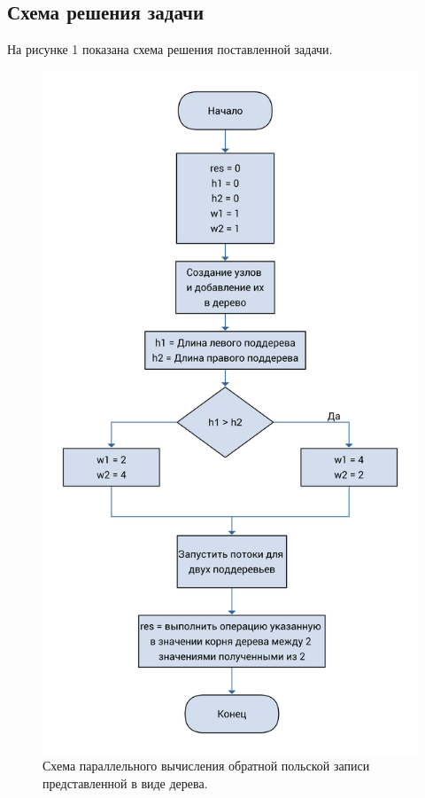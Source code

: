 \documentclass[a4paper, 12pt]{article}
\begin{document}
	\subsection{Схема решения задачи}
	\hspace*{5mm} На рисунке 1 показана схема решения поставленной задачи. 
	\begin{figure}[h!]
		\centering \includegraphics[scale=0.060]{1}
		\centering\caption{Схема параллельного вычисления обратной польской записи представленной в виде дерева.}
	\end{figure}
\end{document}
